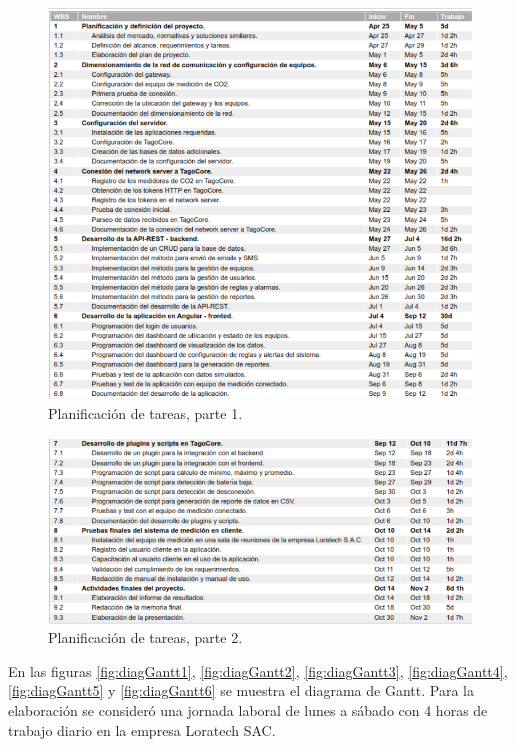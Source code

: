 \documentclass[
11pt, %
]{charter}
\begin{document}
\begin{figure}[htpb]
\centering 
\includegraphics[width=1.0\textwidth]{./Figuras/WBS1.png}
\caption{Planificación de tareas, parte 1.}
\label{fig:WBS1}
\end{figure}

\begin{figure}[htpb]
\centering 
\includegraphics[width=1.0\textwidth]{./Figuras/WBS2.png}
\caption{Planificación de tareas, parte 2.}
\label{fig:WBS2}
\end{figure}

\newpage
En las figuras \ref{fig:diagGantt1}, \ref{fig:diagGantt2}, \ref{fig:diagGantt3}, \ref{fig:diagGantt4}, \ref{fig:diagGantt5} y \ref{fig:diagGantt6} se muestra el diagrama de Gantt. Para la elaboración se consideró una jornada laboral de lunes a sábado con 4 horas de trabajo diario en la empresa Loratech SAC.
\end{document}
